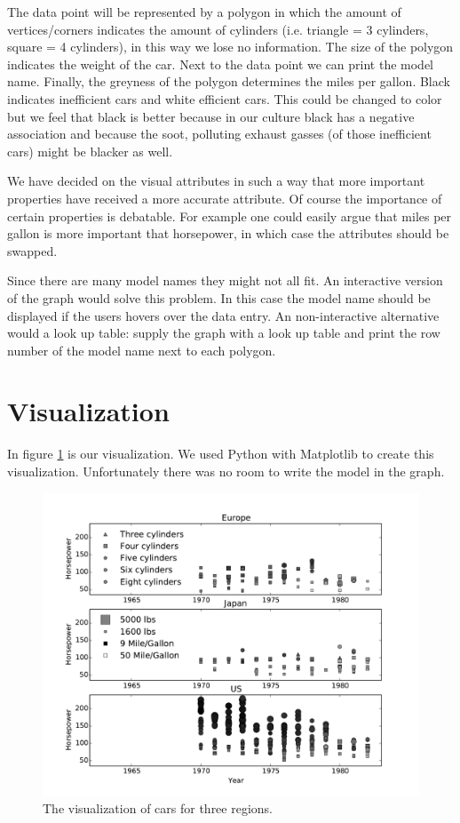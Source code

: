 \documentclass{article}[10pt]
\begin{document}
The data point will be represented by a polygon in which the amount of
vertices/corners indicates the amount of cylinders (i.e. triangle = 3 cylinders,
square = 4 cylinders), in this way we lose no information. The size of the
polygon indicates the weight of the car.
Next to the data point we can print the model name.
Finally, the greyness of the polygon determines the miles per gallon. Black
indicates inefficient cars and white efficient cars. This could be changed to
color but we feel that black is better because in our culture black has a
negative association and because the soot, polluting exhaust gasses
(of those inefficient cars) might be blacker as well.

We have decided on the visual attributes in such a way that more important
properties have received a more accurate attribute. Of course the importance of
certain properties is debatable. For example one could easily argue that
miles per gallon is more important that horsepower, in which case the attributes
should be swapped.

Since there are many model names they might not all fit. An interactive version
of the graph would solve this problem. In this case the model name should be
displayed if the users hovers over the data entry. An non-interactive
alternative would a look up table: supply the graph with a look up table and
print the row number of the model name next to each polygon.

\section{Visualization}
In figure \ref{fig:vis} is our visualization. We used Python with Matplotlib to
create this visualization. Unfortunately there was no room to write the model in
the graph.

\begin{figure}[h!]
\includegraphics[width=\textwidth]{autovis}
\caption{The visualization of cars for three regions.}
\label{fig:vis}
\end{figure}
\end{document}
